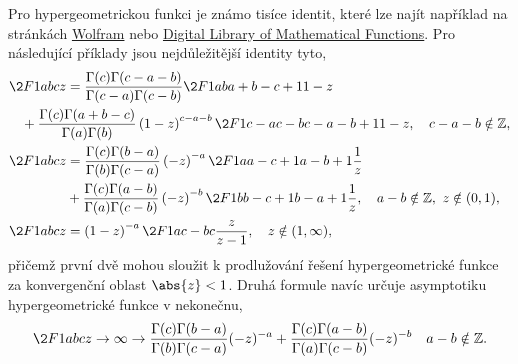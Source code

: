 Pro hypergeometrickou funkci je známo tisíce identit, které lze najít například na stránkách 
\href{http://functions.wolfram.com/HypergeometricFunctions/Hypergeometric2F1/17/ShowAll.html}
{Wolfram} 
nebo \href{http://dlmf.nist.gov/15}{Digital Library of Mathematical Functions}.
Pro následující příklady jsou nejdůležitější identity tyto,
\begin{subequations}
    \begin{align}
        \2F1{a}{b}{c}{z}
            &=\frac{\Gamma(c)\Gamma(c-a-b)}{\Gamma(c-a)\Gamma(c-b)}
                \2F1{a}{b}{a+b-c+1}{1-z}\nonumber\\
        \label{eq:2F1Identity1}
            &\!\!\!\!\!\!\!\!\!\!\!\!\!\!\!\!\!\!\!\!
                +\frac{\Gamma(c)\Gamma(a+b-c)}{\Gamma(a)\Gamma(b)}\left(1-z\right)^{c-a-b}
                \2F1{c-a}{c-b}{c-a-b+1}{1-z},\quad c-a-b\notin\mathbb{Z},\\
        \2F1{a}{b}{c}{z}
            &=\frac{\Gamma(c)\Gamma(b-a)}{\Gamma(b)\Gamma(c-a)}\left(-z\right)^{-a}
                \2F1{a}{a-c+1}{a-b+1}{\frac{1}{z}}\nonumber\\
        \label{eq:2F1Identity3}
            &+\frac{\Gamma(c)\Gamma(a-b)}{\Gamma(a)\Gamma(c-b)}\left(-z\right)^{-b}
                \2F1{b}{b-c+1}{b-a+1}{\frac{1}{z}},\quad a-b\notin\mathbb{Z},\ z\notin(0,1),\\
        \label{eq:2F1Identity2}
        \2F1{a}{b}{c}{z}
            &=\left(1-z\right)^{-a}\2F1{a}{c-b}{c}{\frac{z}{z-1}},\quad z\notin(1,\infty),
    \end{align}
\end{subequations}
přičemž první dvě mohou sloužit k prodlužování řešení hypergeometrické funkce
za konvergenční oblast $\abs{z}<1$.
Druhá formule navíc určuje asymptotiku hypergeometrické funkce v nekonečnu,
\begin{equation}
    \label{eq:2F1Asymptotic}
    \2F1{a}{b}{c}{z\rightarrow\infty}\rightarrow
        \frac{\Gamma(c)\Gamma(b-a)}{\Gamma(b)\Gamma(c-a)}(-z)^{-a}+
        \frac{\Gamma(c)\Gamma(a-b)}{\Gamma(a)\Gamma(c-b)}(-z)^{-b}\quad a-b\notin\mathbb{Z}.
\end{equation}
